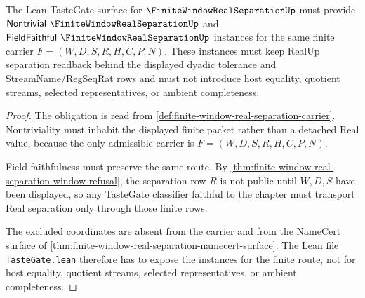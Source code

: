 \begin{theorem}
\label{thm:finite-window-real-separation-tastegate-obligation}
The Lean TasteGate surface for $\FiniteWindowRealSeparationUp$ must provide $\mathsf{Nontrivial}\ \FiniteWindowRealSeparationUp$ and $\mathsf{FieldFaithful}\ \FiniteWindowRealSeparationUp$ instances for the same finite carrier $F=(W,D,S,R,H,C,P,N)$. These instances must keep RealUp separation readback behind the displayed dyadic tolerance and StreamName/RegSeqRat rows and must not introduce host equality, quotient streams, selected representatives, or ambient completeness.
\end{theorem}
\begin{proof}
The obligation is read from \autoref{def:finite-window-real-separation-carrier}. Nontriviality must inhabit the displayed finite packet rather than a detached Real value, because the only admissible carrier is $F=(W,D,S,R,H,C,P,N)$.

Field faithfulness must preserve the same route. By \autoref{thm:finite-window-real-separation-window-refusal}, the separation row $R$ is not public until $W,D,S$ have been displayed, so any TasteGate classifier faithful to the chapter must transport Real separation only through those finite rows.

The excluded coordinates are absent from the carrier and from the NameCert surface of \autoref{thm:finite-window-real-separation-namecert-surface}. The Lean file \texttt{TasteGate.lean} therefore has to expose the instances for the finite route, not for host equality, quotient streams, selected representatives, or ambient completeness.
\end{proof}

